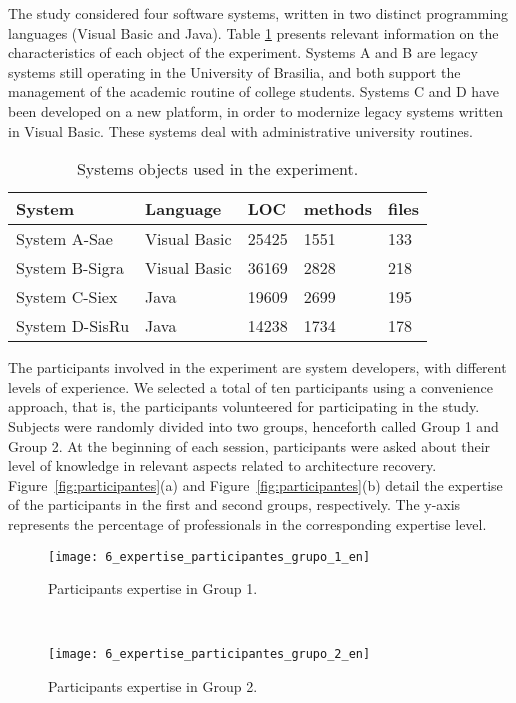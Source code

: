 The study considered four software systems, written in two distinct programming languages (Visual Basic and Java). Table \ref{tabelaSistemasObjetos}  presents relevant information on the characteristics of each object of the experiment. Systems A 
and B are legacy systems still operating in the University of Brasilia, 
and both support the management of the academic routine of college students. 
Systems C and D have been developed on a new platform, in order 
to modernize legacy systems written in Visual Basic. These systems 
deal with administrative university routines.

\begin{table}[h]
	\centering
	\caption{Systems objects used in the experiment.}
	\label{tabelaSistemasObjetos}
	\begin{tabular}{|lllll|}
		\hline
		System  & Language    & LOC   &  methods & files  \\ \hline
		System A-Sae             & Visual Basic & 25425 & 1551       & 133        \\
		System B-Sigra           & Visual Basic & 36169 & 2828       & 218        \\
		System C-Siex            & Java         & 19609 & 2699       & 195        \\
		System D-SisRu           & Java         & 14238 & 1734       & 178        \\ \hline
	\end{tabular}
\end{table}


The participants involved in the experiment are system developers, with different levels of experience. We selected a total of ten participants using a convenience approach, that is, the participants volunteered for participating in the study. Subjects were randomly divided into two groups, henceforth called Group 1 and Group 2. At the beginning of each session, participants were asked about their level of knowledge in relevant aspects related to architecture recovery. Figure~\ref{fig:participantes}(a) and Figure~\ref{fig:participantes}(b) 
detail the expertise of the participants in the first and second groups, respectively. 
The y-axis represents the percentage of professionals in the corresponding expertise level.

\begin{figure*}[t!]
 \begin{subfigure}[t]{0.5\textwidth}
	\centering
	\texttt{[image: 6\_expertise\_participantes\_grupo\_1\_en]}
	\caption{Participants expertise in Group 1.}
 \end{subfigure}
 ~
 \begin{subfigure}[t]{0.5\textwidth}
	\centering
	\texttt{[image: 6\_expertise\_participantes\_grupo\_2\_en]}
	\caption{Participants expertise in Group 2.}
 \end{subfigure}
\caption{Expertise of the participants.}
\label{fig:participantes}
\end{figure*}

